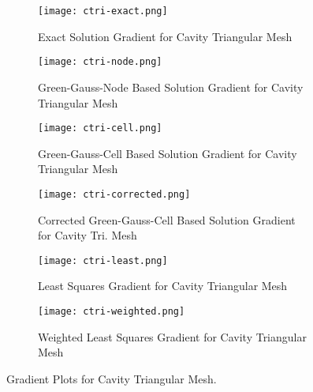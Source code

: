 \documentclass{article}
\begin{document}
\begin{figure}[H]
  \centering
  \captionsetup{font=small}
  \begin{subfigure}{.45\textwidth}
    \centering
    \texttt{[image: ctri-exact.png]}
    \caption{Exact Solution Gradient for Cavity Triangular Mesh}
    \label{fig:21}
  \end{subfigure}%
  \hfill
  \begin{subfigure}{.45\textwidth}
    \centering
    \texttt{[image: ctri-node.png]}
    \caption{Green-Gauss-Node Based Solution Gradient for Cavity Triangular Mesh}
    \label{fig:22}
  \end{subfigure}

  \begin{subfigure}{.45\textwidth}
    \centering
    \texttt{[image: ctri-cell.png]}
    \caption{Green-Gauss-Cell Based Solution Gradient for Cavity Triangular Mesh}
    \label{fig:23}
  \end{subfigure}%
  \hfill
  \begin{subfigure}{.45\textwidth}
    \centering
    \texttt{[image: ctri-corrected.png]}
    \caption{Corrected Green-Gauss-Cell Based Solution Gradient for Cavity Tri. Mesh}
    \label{fig:24}
  \end{subfigure}

  \begin{subfigure}{.45\textwidth}
    \centering
    \texttt{[image: ctri-least.png]}
    \caption{Least Squares Gradient for Cavity Triangular Mesh}
    \label{fig:25}
  \end{subfigure}%
  \hfill
  \begin{subfigure}{.45\textwidth}
    \centering
    \texttt{[image: ctri-weighted.png]}
    \caption{Weighted Least Squares Gradient for Cavity Triangular Mesh}
    \label{fig:26}
  \end{subfigure}
  
  \caption{Gradient Plots for Cavity Triangular Mesh.}
  \label{fig:2}
\end{figure}
\end{document}
